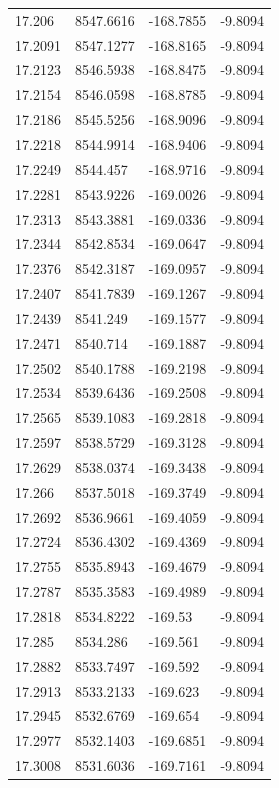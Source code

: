 \begin{table}[H]
\begin{tabular}{llll}
17.206 & 8547.6616 & -168.7855 & -9.8094 \\
17.2091 & 8547.1277 & -168.8165 & -9.8094 \\
17.2123 & 8546.5938 & -168.8475 & -9.8094 \\
17.2154 & 8546.0598 & -168.8785 & -9.8094 \\
17.2186 & 8545.5256 & -168.9096 & -9.8094 \\
17.2218 & 8544.9914 & -168.9406 & -9.8094 \\
17.2249 & 8544.457 & -168.9716 & -9.8094 \\
17.2281 & 8543.9226 & -169.0026 & -9.8094 \\
17.2313 & 8543.3881 & -169.0336 & -9.8094 \\
17.2344 & 8542.8534 & -169.0647 & -9.8094 \\
17.2376 & 8542.3187 & -169.0957 & -9.8094 \\
17.2407 & 8541.7839 & -169.1267 & -9.8094 \\
17.2439 & 8541.249 & -169.1577 & -9.8094 \\
17.2471 & 8540.714 & -169.1887 & -9.8094 \\
17.2502 & 8540.1788 & -169.2198 & -9.8094 \\
17.2534 & 8539.6436 & -169.2508 & -9.8094 \\
17.2565 & 8539.1083 & -169.2818 & -9.8094 \\
17.2597 & 8538.5729 & -169.3128 & -9.8094 \\
17.2629 & 8538.0374 & -169.3438 & -9.8094 \\
17.266 & 8537.5018 & -169.3749 & -9.8094 \\
17.2692 & 8536.9661 & -169.4059 & -9.8094 \\
17.2724 & 8536.4302 & -169.4369 & -9.8094 \\
17.2755 & 8535.8943 & -169.4679 & -9.8094 \\
17.2787 & 8535.3583 & -169.4989 & -9.8094 \\
17.2818 & 8534.8222 & -169.53 & -9.8094 \\
17.285 & 8534.286 & -169.561 & -9.8094 \\
17.2882 & 8533.7497 & -169.592 & -9.8094 \\
17.2913 & 8533.2133 & -169.623 & -9.8094 \\
17.2945 & 8532.6769 & -169.654 & -9.8094 \\
17.2977 & 8532.1403 & -169.6851 & -9.8094 \\
17.3008 & 8531.6036 & -169.7161 & -9.8094 \\

\end{tabular}
\end{table}
